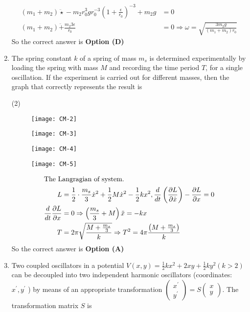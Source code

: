 \begin{enumerate}
\begin{answer}
\begin{align*}
	\left(m_{1}+m_{2}\right) \ddot{\star}-m_{2} r_{0}^{3} g r_{0}^{-3}\left(1+\frac{\epsilon}{r_{0}}\right)^{-3}+m_{2} g&=0\\
	\left(m_{1}+m_{2}\right) \ddot+\frac{m_{2} 3 \epsilon}{r_{0}}&=0 \Rightarrow \omega=\sqrt{\frac{3 m_{2} g}{\left(m_{1}+m_{2}\right) r_{0}}}
	\end{align*}
	So the correct answer is \textbf{Option (D)}
\end{answer}
	\item The spring constant $k$ of a spring of mass $m_{s}$ is determined experimentally by loading the spring with mass $M$ and recording the time period $T$, for a single oscillation. If the experiment is carried out for different masses, then the graph that correctly represents the result is
{	}
\begin{tasks}(2)
\task[\textbf{A.}] \begin{figure}[H]
	\centering
	\texttt{[image: CM-2]}
\end{figure}
\task[\textbf{B.}] \begin{figure}[H]
	\centering
	\texttt{[image: CM-3]}
\end{figure}
\task[\textbf{C.}] \begin{figure}[H]
	\centering
	\texttt{[image: CM-4]}
\end{figure}
\task[\textbf{D.}] \begin{figure}[H]
	\centering
	\texttt{[image: CM-5]}
\end{figure}
\end{tasks}
\begin{answer}
\begin{align*}
\intertext{The Langragian of system.}
L&=\frac{1}{2} \cdot \frac{m_{s}}{3} \dot{x}^{2}+\frac{1}{2} M \dot{x}^{2}-\frac{1}{2} k x^{2}, \frac{d}{d t}\left(\frac{\partial L}{\partial \dot{x}}\right)-\frac{\partial L}{\partial x}=0\\
\frac{d}{d t} \frac{\partial L}{\partial x}&=0 \Rightarrow\left(\frac{m_{s}}{3}+M\right) \ddot{x}=-k x\\
T&=2 \pi \sqrt{\frac{M+\frac{m_{s}}{3}}{k}} \Rightarrow T^{2}=4 \pi \frac{\left(M+\frac{m_{s}}{3}\right)}{k}
\end{align*}
So the correct answer is \textbf{Option (A)}
\end{answer}
	\item Two coupled oscillators in a potential $V(x, y)=\frac{1}{2} k x^{2}+2 x y+\frac{1}{2} k y^{2}(k>2)$ can be decoupled into two independent harmonic oscillators (coordinates: $x^{\prime}, y^{\prime}$ ) by means of an appropriate transformation $\left(\begin{array}{c}x^{\prime} \\ y^{\prime}\end{array}\right)=S\left(\begin{array}{l}x \\ y\end{array}\right) .$ The transformation matrix $S$ is

\end{enumerate}
